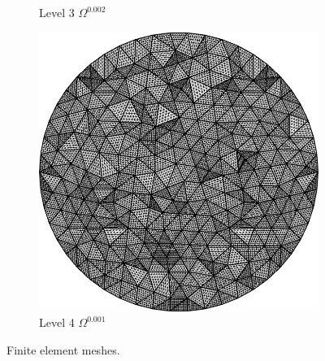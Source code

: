 \documentclass{report}
\begin{document}
\begin{figure}[t]
\begin{subfigure}[t]{.23\linewidth}
   \caption{Level 3 $\Omega^{0.002}$}
 \end{subfigure}\hfill
  \begin{subfigure}[t]{.23\linewidth}
  \includegraphics[width=1\textwidth]{./Images/M4.png}
   \caption{Level 4 $\Omega^{0.001}$}
 \end{subfigure}
 \caption{Finite element meshes.}\label{fig:4meshes}
 \end{figure}
	
\end{document}
